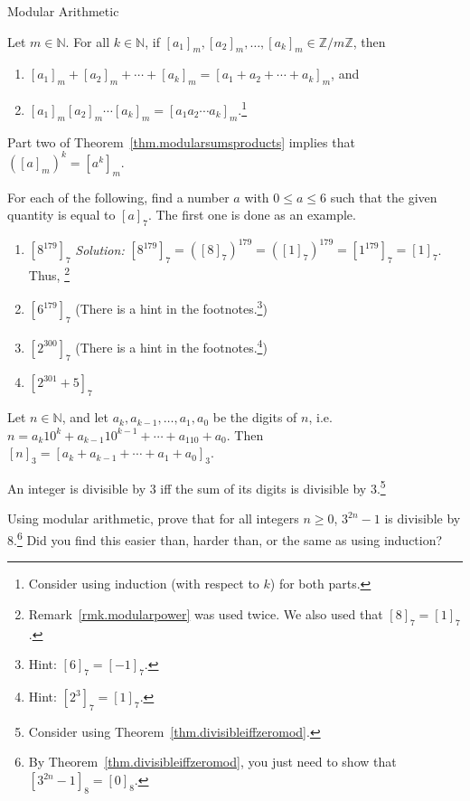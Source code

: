 \begin{section}{Modular Arithmetic}
\begin{theorem}\label{thm.modularsumsproducts}
Let $m\in \mathbb{N}$.  For all $k\in \mathbb{N}$, if $[a_1]_m,[a_2]_m,\ldots, [a_k]_m \in \mathbb{Z}/m\mathbb{Z}$, then 
\begin{enumerate}
\item $[a_1]_m+[a_2]_m+\cdots+ [a_k]_m = [a_1 + a_2 +\cdots+ a_k]_m$, and
\item $[a_1]_m [a_2]_m \cdots  [a_k]_m = [a_1 a_2 \cdots a_k]_m$.\footnote{Consider using induction (with respect to $k$) for both parts.} 
\end{enumerate}
\end{theorem}

\begin{remark}\label{rmk.modularpower}
Part two of Theorem~\ref{thm.modularsumsproducts} implies that $([a]_m)^k = [a^k]_m$.
\end{remark}

\begin{exercise}
For each of the following, find a number $a$ with $0\le a \le 6$ such that the given quantity is equal to $[a]_7$. The first one is done as an example.
\begin{enumerate}
\item $[8^{179}]_7$
 \quad\textit{Solution:}  $[8^{179}]_7 = ([8]_7)^{179} =  ([1]_7)^{179} =  [1^{179}]_7 = [1]_7$. Thus,  \footnote{Remark~\ref{rmk.modularpower} was used twice. We also used that  $[8]_7 = [1]_7$.}
\item $[6^{179}]_7$ \quad(There is a hint in the footnotes.\footnote{Hint:  $[6]_7 = [-1]_7$.})
\item $[2^{300}]_7$ \quad(There is a hint in the footnotes.\footnote{Hint:  $[2^3]_7 = [1]_7$.})
\item $[2^{301} +5]_7$
\end{enumerate}
\end{exercise}

\begin{theorem}
Let $n\in \mathbb{N}$, and let $a_k, a_{k-1}, \ldots, a_1, a_0$ be the digits of $n$, i.e. $n=a_k10^k + a_{k-1}10^{k-1} + \cdots + a_110 + a_0$. Then $[n]_3 =  [a_k + a_{k-1} + \cdots + a_1 + a_0]_3$.
\end{theorem}

\begin{theorem}
An integer is divisible by $3$ iff the sum of its digits is divisible by $3$.\footnote{Consider using Theorem~\ref{thm.divisibleiffzeromod}.}
\end{theorem}

\begin{exercise}
Using modular arithmetic, prove that for all integers $n \ge 0$, $3^{2n}-1$ is divisible by $8$.\footnote{By Theorem~\ref{thm.divisibleiffzeromod}, you just need to show that $[3^{2n}-1]_8 = [0]_8$.} Did you find this easier than, harder than, or the same as using induction?
\end{exercise}

\end{section}
